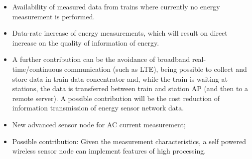 \begin{itemize}
	\setlength\itemsep{0em}
	
	\item Availability of measured data from trains where currently no energy measurement is performed.
	
	\item Data-rate increase of energy measurements, which will result on direct increase on the quality of information of energy.
	
	\item A further contribution can be the avoidance of broadband real-time/continuous communication (such as LTE), being possible to collect and store data in train data concentrator and, while the train is waiting at stations, the data is transferred between train and station AP (and then to a remote server). A possible contribution will be the cost reduction of information transmission of energy sensor network data.
	
	\item New advanced sensor node for AC current measurement;
	
	\item Possible contribution: Given the measurement characteristics, a self powered wireless sensor node can implement features of high processing.
	
\end{itemize}





